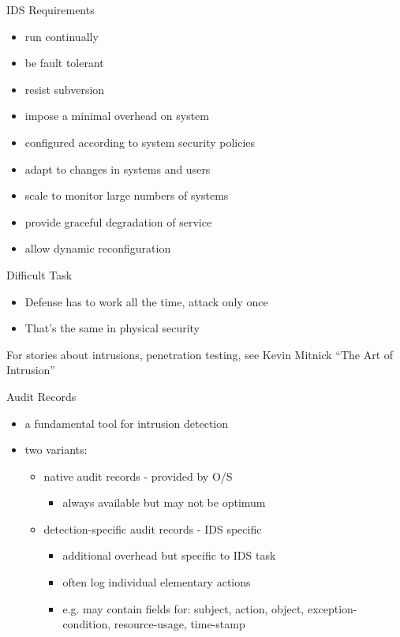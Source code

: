 \documentclass{beamer}
\begin{document}
\begin{frame}{IDS Requirements}
  \begin{itemize}
  \item run continually 
  \item be fault tolerant 
  \item resist subversion 
  \item impose a minimal overhead on system 
  \item configured according to system security policies 
  \item adapt to changes in systems and users 
  \item scale to monitor large numbers of systems 
  \item provide graceful degradation of service 
  \item allow dynamic reconfiguration 
  \end{itemize}
\end{frame}

\begin{frame}{Difficult Task}
  \begin{itemize}
  \item Defense has to work all the time, attack only 
    once
  \item That's the same in physical security
  \end{itemize}
  For stories about intrusions, penetration testing, 
see Kevin Mitnick ``The Art of Intrusion''
\end{frame}


\begin{frame}{Audit Records}
  \begin{itemize}
  \item a fundamental tool for intrusion detection 
  \item two variants: 
    \begin{itemize}
    \item native audit records - provided by O/S 
      \begin{itemize}
      \item always available but may not be optimum 
      \end{itemize}
    \item detection-specific audit records - IDS specific 
      \begin{itemize}
      \item additional overhead but specific to IDS task 
      \item often log individual elementary actions 
      \item e.g. may contain fields for: subject, action, object, 
        exception-condition, resource-usage, time-stamp
      \end{itemize}
    \end{itemize}
  \end{itemize}
\end{frame}
\end{document}
